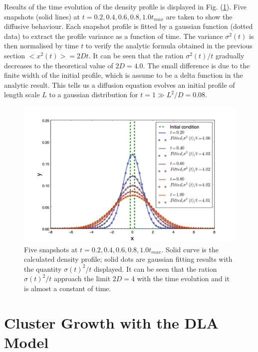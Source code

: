 \documentclass[a4paper,12pt]{article}
\begin{document}
Results of the time evolution of the density profile is displayed in Fig. (\ref{diffusion_pic_snapshots}). Five snapshots (solid lines) at $t = 0.2, 0.4, 0.6, 0.8, 1.0 t_{max}$ are taken to show the diffusive behaviour. Each snapshot profile is fitted by a gaussian function (dotted data) to extract the profile variance as a function of time. The variance $\sigma^2(t)$ is then normalised by time $t$ to verify the analytic formula obtained in the previous section $<x^2(t)> = 2Dt$. It can be seen that the ration $\sigma^2(t)/t$ gradually decreases to the theoretical value of $2D = 4.0$. The small difference is due to the finite width of the initial profile, which is assume to be a delta function in the analytic result. This tells us a diffusion equation evolves an initial profile of length scale $L$ to a gaussian distribution for $t = 1 \gg L^2/D = 0.08$.
\begin{figure}[htbp]
\begin{center}
\includegraphics[width = \textwidth]{pics/diffusion_snapshot.jpeg}
\caption{Five snapshots at $t = 0.2, 0.4, 0.6, 0.8, 1.0 t_{max}$. Solid curve is the calculated density profile; solid dots are gaussian fitting results with the quantity $\sigma(t)^2/t$ displayed. It can be seen that the ration $\sigma(t)^2/t$ approach the limit $2D = 4$ with the time evolution and it is almost a constant of time.}
\label{diffusion_pic_snapshots}
\end{center}
\end{figure}



\section{Cluster Growth with the DLA Model}
\end{document}

